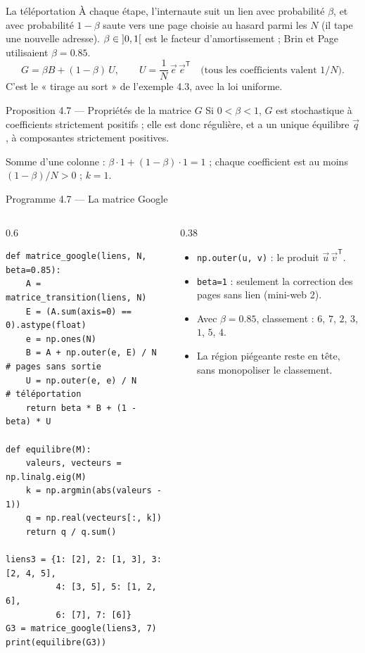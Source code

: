 \begin{frame}{La téléportation}
  \small À chaque étape, l'internaute suit un lien avec probabilité
  $\beta$, et avec probabilité $1-\beta$ saute vers une page choisie au
  hasard parmi les $N$ (il tape une nouvelle adresse). $\beta\in\mathopen{]}{0},{1}\mathclose{[}$
  est le facteur d'amortissement ; Brin et Page utilisaient
  $\beta=\num{0.85}$.
  \[
    G = \beta B+(1-\beta)\,U,\qquad U = \frac1N\,\vec e\,\vec e^{\mathsf T}
    \quad\text{(tous les coefficients valent $1/N$).} \tag{4.3}
  \]
  C'est le « tirage au sort » de l'exemple 4.3, avec la loi uniforme.
  \begin{Enonce}{Proposition 4.7 --- Propriétés de la matrice $G$}
    \small Si $0<\beta<1$, $G$ est stochastique à coefficients
    strictement positifs ; elle est donc régulière, et a un unique
    équilibre $\vec q$, à composantes strictement positives.
  \end{Enonce}
  \begin{AuTableau}
    \footnotesize Somme d'une colonne : $\beta\cdot1+(1-\beta)\cdot1=1$ ;
    chaque coefficient est au moins $(1-\beta)/N>0$ ; $k=1$.
  \end{AuTableau}
\end{frame}

\begin{frame}[fragile]{Programme 4.7 --- La matrice Google}
  \begin{columns}[T]
    \begin{column}{0.6\textwidth}
\begin{lstlisting}
def matrice_google(liens, N, beta=0.85):
    A = matrice_transition(liens, N)
    E = (A.sum(axis=0) == 0).astype(float)
    e = np.ones(N)
    B = A + np.outer(e, E) / N    # pages sans sortie
    U = np.outer(e, e) / N        # téléportation
    return beta * B + (1 - beta) * U

def equilibre(M):
    valeurs, vecteurs = np.linalg.eig(M)
    k = np.argmin(abs(valeurs - 1))
    q = np.real(vecteurs[:, k])
    return q / q.sum()

liens3 = {1: [2], 2: [1, 3], 3: [2, 4, 5],
          4: [3, 5], 5: [1, 2, 6],
          6: [7], 7: [6]}
G3 = matrice_google(liens3, 7)
print(equilibre(G3))
\end{lstlisting}
    \end{column}
    \begin{column}{0.38\textwidth}
      \small
      \begin{itemize}
        \item \texttt{np.outer(u, v)} : le produit
          $\vec u\,\vec v^{\mathsf T}$.
        \item \texttt{beta=1} : seulement la correction des pages sans
          lien (mini-web 2).
        \item Avec $\beta=\num{0.85}$, classement : $6$, $7$, $2$, $3$,
          $1$, $5$, $4$.
        \item La région piégeante reste en tête, sans monopoliser le
          classement.
      \end{itemize}
    \end{column}
  \end{columns}
\end{frame}

